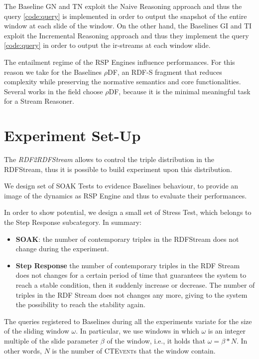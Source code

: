 The Baseline GN and TN exploit the Naive Reasoning approach and thus the query \ref{code:query} is implemented in order to output the snapshot of the entire window at each slide of the window. On the other hand, the Baselines GI and TI exploit the Incremental Reasoning approach and thus they implement the query \ref{code:query} in order to output the ir-streams at each window slide.

The entailment regime of the RSP Engines influence performances. For this reason we take for the Baselines $\rho$DF, an RDF-S fragment that reduces complexity while preserving the normative semantics and core functionalities. \cite{DBLP:conf/esws/MunozPG07}  Several works in the field \cite{DBLP:conf/semweb/UrbaniMJHB13, Liu:2014:ERS:2567948.2577323} choose $\rho$DF, because it is the minimal meaningful task for a Stream Reasoner.

\section{Experiment Set-Up}

The \textit{RDF2RDFStream} allows to control the triple distribution in the RDFStream, thus it is possible to build experiment upon this distribution. 

We design set of SOAK Tests to evidence Baselines behaviour, to provide an image of the dynamics as RSP Engine  and thus to evaluate their performances. 

In order to show \name potential, we design a small set of Stress Test, which belongs to the Step Response subcategory. In summary:

\begin{itemize}
\item \textbf{SOAK}: the number of contemporary triples in the RDFStream does not change during the experiment.
\item \textbf{Step Response} the number of contemporary triples in the RDF Stream does not changes for a certain period of time that guarantees the system to reach a stable condition, then it suddenly increase or decrease. The number of triples in the RDF Stream does not changes any more, giving to the system the possibility to reach the stability again.
\end{itemize}

The queries registered to \name Baselines during all the experiments variate for the size of the sliding window $\omega$. In particular, we use windows in which $\omega$ is an integer multiple of the slide parameter $\beta$ of the window, i.e., it holds that $\omega = \beta * N$. In other words, $N$ is the number of \textsc{CTEvent}s that the window contain. 

